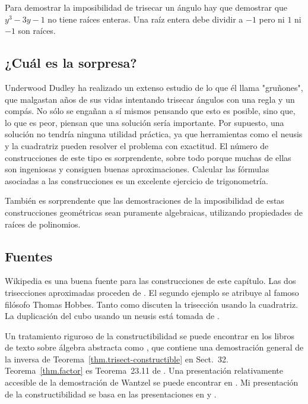 Para demostrar la imposibilidad de trisecar un ángulo hay que demostrar que $y^3-3y-1$ no tiene raíces enteras. Una raíz entera debe dividir a $-1$ pero ni $1$ ni $-1$ son raíces.

\subsection*{¿Cuál es la sorpresa?}

Underwood Dudley ha realizado un extenso estudio de lo que él llama "gruñones", que malgastan años de sus vidas intentando trisecar ángulos con una regla y un compás. No sólo se engañan a sí mismos pensando que esto es posible, sino que, lo que es peor, piensan que una solución sería importante. Por supuesto, una solución no tendría ninguna utilidad práctica, ya que herramientas como el neusis y la cuadratriz pueden resolver el problema con exactitud. El número de construcciones de este tipo es sorprendente, sobre todo porque muchas de ellas son ingeniosas y consiguen buenas aproximaciones. Calcular las fórmulas asociadas a las construcciones es un excelente ejercicio de trigonometría.

También es sorprendente que las demostraciones de la imposibilidad de estas construcciones geométricas sean puramente algebraicas, utilizando propiedades de raíces de polinomios.

\subsection*{Fuentes}

Wikipedia \cite{wiki:tri, wiki:neu, wiki:quad} es una buena fuente para las construcciones de este capítulo. Las dos trisecciones aproximadas proceden de \cite[pp.~67--68, 95--96]{dudley-budget}. El segundo ejemplo se atribuye al famoso filósofo Thomas Hobbes. Tanto \cite[pp.~48--49]{martin} como \cite[pp.~6--7]{dudley-budget} discuten la trisección usando la cuadratriz.
La duplicación del cubo usando un neusis está tomada de \cite{dorrie2}.

Un tratamiento riguroso de la constructibilidad se puede encontrar en los libros de texto sobre álgebra abstracta como \cite{fraleigh}, que contiene una demostración general de la inversa de Teorema~\ref{thm.trisect-constructible} en Sect.~32. Teorema~\ref{thm.factor} es Teorema~23.11 de \cite{fraleigh}. Una presentación relativamente accesible de la demostración de Wantzel se puede encontrar en \cite{suzuki}. Mi presentación de la constructibilidad se basa en las presentaciones en \cite[Capítulo~III]{courant} y \cite{laugwitz}.
